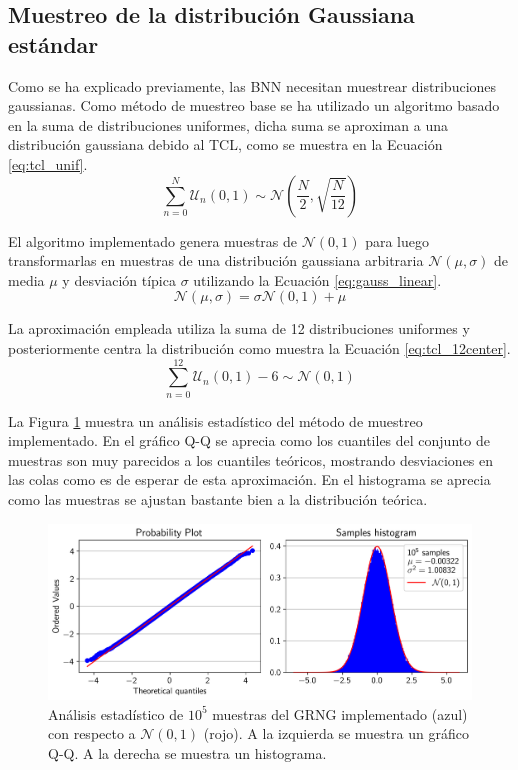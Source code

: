 \subsection{Muestreo de la distribución Gaussiana estándar}

Como se ha explicado previamente, las BNN necesitan muestrear distribuciones gaussianas. Como método de muestreo base se ha utilizado un algoritmo basado en la suma de distribuciones uniformes, dicha suma se aproximan a una distribución gaussiana debido al TCL, como se muestra en la Ecuación \ref{eq:tcl_unif}.
\begin{equation} \label{eq:tcl_unif}
\sum_{n=0}^{N} \mathcal{U}_n(0,1) \sim \mathcal{N} \left( \dfrac{N}{2}, \sqrt{\dfrac{N}{12}} \right)
\end{equation}

El algoritmo implementado genera muestras de $\mathcal{N}(0,1)$ para luego transformarlas en muestras de una distribución gaussiana arbitraria $\mathcal{N}(\mu, \sigma)$ de media $\mu$ y desviación típica $\sigma$ utilizando la Ecuación \ref{eq:gauss_linear}.
\begin{equation} \label{eq:gauss_linear}
\mathcal{N}(\mu, \sigma) = \sigma \mathcal{N}(0,1) + \mu
\end{equation}

La aproximación empleada utiliza la suma de 12 distribuciones uniformes y posteriormente centra la distribución como muestra la Ecuación \ref{eq:tcl_12center}.
\begin{equation} \label{eq:tcl_12center}
\sum_{n=0}^{12} \mathcal{U}_n(0,1) - 6 \sim \mathcal{N}(0,1)
\end{equation}

La Figura \ref{fig:gauss_aprox} muestra un análisis estadístico del método de muestreo implementado. En el gráfico Q-Q se aprecia como los cuantiles del conjunto de muestras son muy parecidos a los cuantiles teóricos, mostrando desviaciones en las colas como es de esperar de esta aproximación. En el histograma se aprecia como las muestras se ajustan bastante bien a la distribución teórica.

\begin{figure}[h]
    \centering
    \includegraphics[width=\textwidth]{root/Imagenes/4_bnn_riscv/gaus_aprox.png}
    \caption{Análisis estadístico de $10^5$ muestras del GRNG implementado (azul) con respecto a $\mathcal{N}(0,1)$ (rojo). A la izquierda se muestra un gráfico Q-Q. A la derecha se muestra un histograma.}
    \label{fig:gauss_aprox}
\end{figure}

